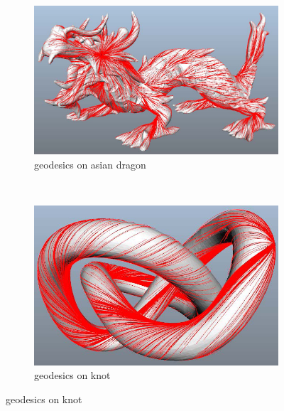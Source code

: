\begin{figure}[H]
        \begin{subfigure}[b]{0.5\textwidth}
                \includegraphics[width=\textwidth]{../images/geodesic_image/asian_dragon}
                \caption{geodesics on asian dragon}
                \label{fig:asian_dragon}
        \end{subfigure}%
        ~ %
        \begin{subfigure}[b]{0.5\textwidth}
                \includegraphics[width=\textwidth]{../images/geodesic_image/knot-1}
                \caption{geodesics on knot}
                \label{fig:knot}
        \end{subfigure}	             
\end{figure}


